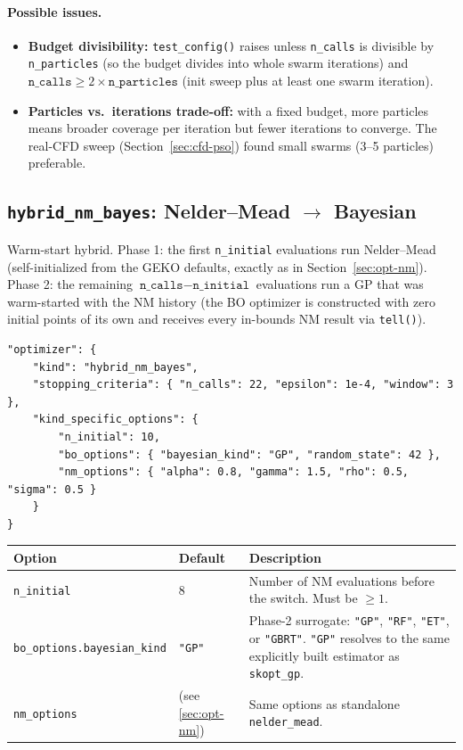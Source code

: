 \paragraph{Possible issues.}
\begin{itemize}
  \item \textbf{Budget divisibility:} \texttt{test\_config()} raises unless
        \texttt{n\_calls} is divisible by \texttt{n\_particles} (so the
        budget divides into whole swarm iterations) and
        $\texttt{n\_calls} \geq 2 \times \texttt{n\_particles}$ (init sweep
        plus at least one swarm iteration).
  \item \textbf{Particles vs.\ iterations trade-off:} with a fixed budget,
        more particles means broader coverage per iteration but fewer
        iterations to converge.  The real-CFD sweep
        (Section~\ref{sec:cfd-pso}) found small swarms (3--5 particles)
        preferable.
\end{itemize}

\subsection{\texttt{hybrid\_nm\_bayes}: Nelder--Mead $\to$ Bayesian}
\label{sec:opt-nmbo}

Warm-start hybrid.  Phase 1: the first \texttt{n\_initial} evaluations run
Nelder--Mead (self-initialized from the GEKO defaults, exactly as in
Section~\ref{sec:opt-nm}).  Phase 2: the remaining
$\texttt{n\_calls} - \texttt{n\_initial}$ evaluations run a GP that was
warm-started with the NM history (the BO optimizer is constructed with zero
initial points of its own and receives every in-bounds NM result via
\texttt{tell()}).

\begin{lstlisting}
"optimizer": {
    "kind": "hybrid_nm_bayes",
    "stopping_criteria": { "n_calls": 22, "epsilon": 1e-4, "window": 3 },
    "kind_specific_options": {
        "n_initial": 10,
        "bo_options": { "bayesian_kind": "GP", "random_state": 42 },
        "nm_options": { "alpha": 0.8, "gamma": 1.5, "rho": 0.5, "sigma": 0.5 }
    }
}
\end{lstlisting}

\begin{center}
\begin{tabular}{@{}llp{8.2cm}@{}}
\toprule
Option & Default & Description \\
\midrule
\texttt{n\_initial} & 8 & Number of NM evaluations before the switch.
Must be $\geq 1$. \\
\texttt{bo\_options.bayesian\_kind} & \texttt{"GP"} & Phase-2 surrogate:
\texttt{"GP"}, \texttt{"RF"}, \texttt{"ET"}, or \texttt{"GBRT"}.
\texttt{"GP"} resolves to the same explicitly built estimator as
\texttt{skopt\_gp}. \\
\texttt{nm\_options} & (see \ref{sec:opt-nm}) & Same options as standalone
\texttt{nelder\_mead}. \\
\bottomrule
\end{tabular}
\end{center}

